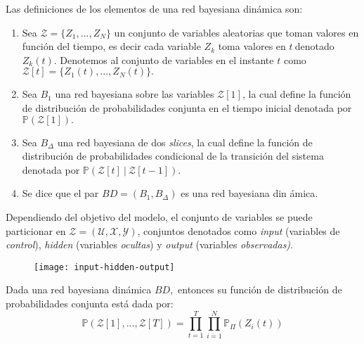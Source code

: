 \begin{definition}
	Las definiciones de los elementos de una red bayesiana dinámica son:
	
	\begin{enumerate}
		\item Sea $\mathcal{Z}=\{Z_{1},...,Z_{N}\}$ un conjunto de variables
		aleatorias que toman valores en función del tiempo, es decir cada
		variable $Z_{k}$ toma valores en $t\ $denotado $Z_{k}(t).$ Denotemos al
		conjunto de variables en el instante $t$ como $\mathcal{Z}%
		[t]=\{Z_{1}(t),...,Z_{N}(t)\}.$
		
		\item Sea $B_{1}$ una red bayesiana sobre las variables $\mathcal{Z}[1]$, la
		cual define la función de distribución de probabilidades conjunta en
		el tiempo inicial denotada por $\mathbb{P}(\mathcal{Z}[1]).$
		
		\item Sea $B_{\Delta }$ una red bayesiana de dos \emph{slices}, la cual
		define la función de distribución de probabilidades condicional de
		la transición del sistema denotada por $\mathbb{P}(\mathcal{Z}[t]\ |\ 
		\mathcal{Z}[t-1]).$
		
		\item Se dice que el par $BD=(B_{1},B_{\Delta })$ es una red bayesiana din%
		ámica.
	\end{enumerate}
\end{definition}

\begin{remark}
	Dependiendo del objetivo del modelo, el conjunto de variables se puede
	particionar en $\mathcal{Z}=(\mathcal{U},\mathcal{X},\mathcal{Y})$,
	conjuntos denotados como \emph{input} (variables de \emph{control}), \emph{%
		hidden} (variables \emph{ocultas}) y \emph{output} (variables \emph{%
		observadas)}.
\end{remark}

\begin{figure}
	\centering
	\texttt{[image: input-hidden-output]}
\end{figure}

\begin{proposition}
	Dada una red bayesiana dinámica $BD,$ entonces su función de
	distribución de probabilidades conjunta está dada por: 
	\begin{equation*}
	\mathbb{P}(\mathcal{Z}[1],...,\mathcal{Z}[T])=\prod\limits_{t=1}^{T}\prod%
	\limits_{i=1}^{N}\mathbb{P}_{\Pi }(Z_{i}(t))
	\end{equation*}
\end{proposition}

